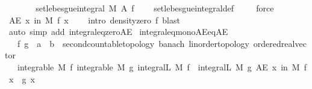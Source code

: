 \begin{isabellebody}
\ \ \ \ \isamarkupfalse%
\ \isamarkupfalse%
\ {\isachardoublequoteopen}set{\isacharunderscore}{\kern0pt}lebesgue{\isacharunderscore}{\kern0pt}integral\ M\ A\ f\ {\isacharequal}{\kern0pt}\ {}{\isachardoublequoteclose}\ \isamarkupfalse%
\ set{\isacharunderscore}{\kern0pt}lebesgue{\isacharunderscore}{\kern0pt}integral{\isacharunderscore}{\kern0pt}def\ \isamarkupfalse%
\ {\isacharasterisk}{\kern0pt}\ \isamarkupfalse%
\ force\isanewline
\ \ \isacommand{{\isacharbraceright}{\kern0pt}}\isamarkupfalse%
\isanewline
\ \ \isamarkupfalse%
\ {\isachardoublequoteopen}AE\ x\ in\ M{\isachardot}{\kern0pt}\ f\ x\ {\isacharequal}{\kern0pt}\ {}{\isachardoublequoteclose}\ \isamarkupfalse%
\ {\isacharparenleft}{\kern0pt}intro\ density{\isacharunderscore}{\kern0pt}zero\ f{\isacharcomma}{\kern0pt}\ blast{\isacharparenright}{\kern0pt}\isanewline
{}\isamarkupfalse%
\ {\isacharparenleft}{\kern0pt}auto\ simp\ add{\isacharcolon}{\kern0pt}\ integral{\isacharunderscore}{\kern0pt}eq{\isacharunderscore}{\kern0pt}zero{\isacharunderscore}{\kern0pt}AE{\isacharparenright}{\kern0pt}%
\endisatagproof
{\isafoldproof}%
%
\isadelimproof
\isanewline
%
\endisadelimproof
\isanewline
{}\isamarkupfalse%
\ integral{\isacharunderscore}{\kern0pt}eq{\isacharunderscore}{\kern0pt}mono{\isacharunderscore}{\kern0pt}AE{\isacharunderscore}{\kern0pt}eq{\isacharunderscore}{\kern0pt}AE{\isacharcolon}{\kern0pt}\isanewline
\ \ \ f\ g\ {\isacharcolon}{\kern0pt}{\isacharcolon}{\kern0pt}\ {\isachardoublequoteopen}{\isacharprime}{\kern0pt}a\ {\isasymRightarrow}\ {\isacharprime}{\kern0pt}b\ {\isacharcolon}{\kern0pt}{\isacharcolon}{\kern0pt}\ {\isacharbraceleft}{\kern0pt}second{\isacharunderscore}{\kern0pt}countable{\isacharunderscore}{\kern0pt}topology{\isacharcomma}{\kern0pt}\ banach{\isacharcomma}{\kern0pt}\ linorder{\isacharunderscore}{\kern0pt}topology{\isacharcomma}{\kern0pt}\ ordered{\isacharunderscore}{\kern0pt}real{\isacharunderscore}{\kern0pt}vector{\isacharbraceright}{\kern0pt}{\isachardoublequoteclose}\isanewline
\ \ \ {\isachardoublequoteopen}integrable\ M\ f{\isachardoublequoteclose}\ {\isachardoublequoteopen}integrable\ M\ g{\isachardoublequoteclose}\ {\isachardoublequoteopen}integral\isactrlsup L\ M\ f\ {\isacharequal}{\kern0pt}\ integral\isactrlsup L\ M\ g{\isachardoublequoteclose}\ {\isachardoublequoteopen}AE\ x\ in\ M{\isachardot}{\kern0pt}\ f\ x\ {\isasymle}\ g\ x{\isachardoublequoteclose}\ \isanewline

\end{isabellebody}
